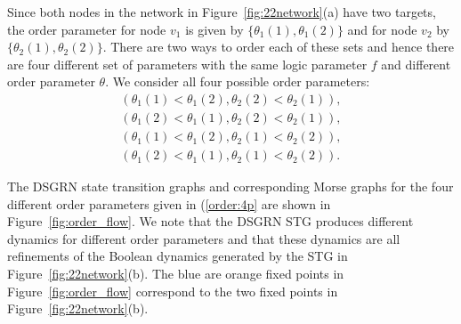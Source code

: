 \documentclass[12pt, notitlepage]{amsart}
\theoremstyle{definition}
\begin{document}
Since both nodes in the network in Figure~\ref{fig:22network}(a) have two targets, the order parameter for node $v_1$ is given by $\{ \theta_1(1), \theta_1(2) \}$ and for node $v_2$ by $\{ \theta_2(1), \theta_2(2) \}$. There are two ways to order each of these sets and hence there are four different set of parameters with the same logic parameter $f$ and different order parameter $\theta$. We consider all four possible order parameters:
\begin{equation}
  \label{order:4p}
  \begin{aligned}
    (\theta_1(1) < \theta_1(2), \theta_2(2) < \theta_2(1)), \\
    (\theta_1(2) < \theta_1(1), \theta_2(2) < \theta_2(1)), \\
    (\theta_1(1) < \theta_1(2), \theta_2(1) < \theta_2(2)), \\
    (\theta_1(2) < \theta_1(1), \theta_2(1) < \theta_2(2)).
  \end{aligned}
\end{equation}

The DSGRN state transition graphs and corresponding Morse graphs for the four different order parameters given in (\ref{order:4p} are shown in Figure~\ref{fig:order_flow}. We note that the DSGRN STG produces different dynamics for different order parameters and that these dynamics are all refinements of the Boolean dynamics generated by the STG in Figure~\ref{fig:22network}(b). The blue are orange fixed points in Figure~\ref{fig:order_flow} correspond to the two fixed points in Figure~\ref{fig:22network}(b).
\end{document}
